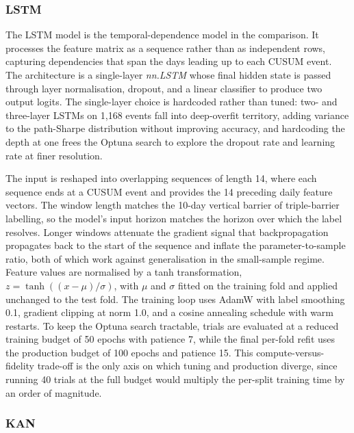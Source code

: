 \documentclass[12pt,a4paper,oneside]{article}
\begin{document}
\subsubsection{LSTM}\label{subsubsec:lstm}

The LSTM model \citep{hochreiter_schmidhuber_1997} is the temporal-dependence model in the comparison. It processes the feature matrix as a sequence rather than as independent rows, capturing dependencies that span the days leading up to each CUSUM event. The architecture is a single-layer \textit{nn.LSTM} whose final hidden state is passed through layer normalisation, dropout, and a linear classifier to produce two output logits. The single-layer choice is hardcoded rather than tuned: two- and three-layer LSTMs on 1,168 events fall into deep-overfit territory, adding variance to the path-Sharpe distribution without improving accuracy, and hardcoding the depth at one frees the Optuna search to explore the dropout rate and learning rate at finer resolution.

The input is reshaped into overlapping sequences of length 14, where each sequence ends at a CUSUM event and provides the 14 preceding daily feature vectors. The window length matches the 10-day vertical barrier of triple-barrier labelling, so the model's input horizon matches the horizon over which the label resolves. Longer windows attenuate the gradient signal that backpropagation propagates back to the start of the sequence and inflate the parameter-to-sample ratio, both of which work against generalisation in the small-sample regime. Feature values are normalised by a tanh transformation, $z = \tanh((x - \mu) / \sigma)$, with $\mu$ and $\sigma$ fitted on the training fold and applied unchanged to the test fold. The training loop uses AdamW \citep{loshchilov_adamw_2019} with label smoothing 0.1, gradient clipping at norm 1.0, and a cosine annealing schedule with warm restarts. To keep the Optuna search tractable, trials are evaluated at a reduced training budget of 50 epochs with patience 7, while the final per-fold refit uses the production budget of 100 epochs and patience 15. This compute-versus-fidelity trade-off is the only axis on which tuning and production diverge, since running 40 trials at the full budget would multiply the per-split training time by an order of magnitude.


\subsubsection{KAN}\label{subsubsec:kan_model}
\end{document}
